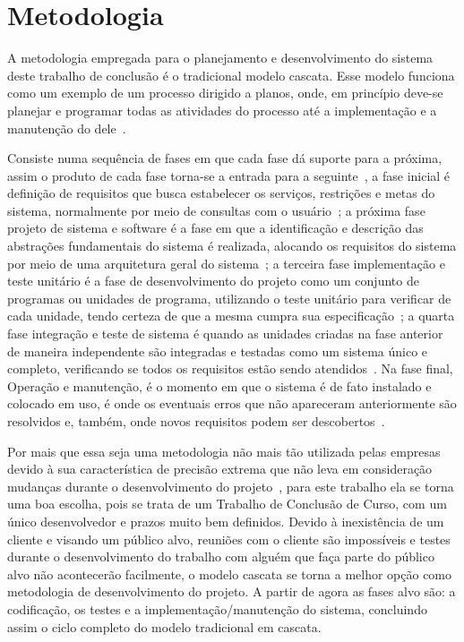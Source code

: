 \chapter{Metodologia}

A metodologia empregada para o planejamento e desenvolvimento do sistema deste trabalho de conclusão é o tradicional modelo cascata.
Esse modelo funciona como um exemplo de um processo dirigido a planos, onde, em princípio deve-se planejar e programar todas as atividades do processo até a implementação e a manutenção do dele~\cite{SOMMERVILLE1}.

Consiste numa sequência de fases em que cada fase dá suporte para a próxima, assim o produto de cada fase torna-se a entrada para a seguinte~\cite{BALTZAN1}, a fase inicial é definição de requisitos que busca estabelecer os serviços, restrições e metas do sistema, normalmente por meio de consultas com o usuário~\cite{SOMMERVILLE1}; a próxima fase projeto de sistema e software é a fase em que a identificação e descrição das abstrações fundamentais do sistema é realizada, alocando os requisitos do sistema por meio de uma arquitetura geral do sistema~\cite{SOMMERVILLE1}; a terceira fase implementação e teste unitário é a fase de desenvolvimento do projeto como um conjunto de programas ou unidades de programa, utilizando o teste unitário para verificar de cada unidade, tendo certeza de que a mesma cumpra sua especificação~\cite{SOMMERVILLE1}; a quarta fase integração e teste de sistema é quando as unidades criadas na fase anterior de maneira independente são integradas e testadas como um sistema único e completo, verificando se todos os requisitos estão sendo atendidos~\cite{SOMMERVILLE1}.
Na fase final, Operação e manutenção, é o momento em que o sistema é de fato instalado e colocado em uso, é onde os eventuais erros que não apareceram anteriormente são resolvidos e, também, onde novos requisitos podem ser descobertos~\cite{SOMMERVILLE1}. 

Por mais que essa seja uma metodologia não mais tão utilizada pelas empresas devido à sua característica de precisão extrema que não leva em consideração mudanças durante o desenvolvimento do projeto~\cite{BALTZAN1}, para este trabalho ela se torna uma boa escolha, pois se trata de um Trabalho de Conclusão de Curso, com um único desenvolvedor e prazos muito bem definidos.
Devido à inexistência de um cliente e visando um público alvo, reuniões com o cliente são impossíveis e testes durante o desenvolvimento do trabalho com alguém que faça parte do público alvo não acontecerão facilmente, o modelo cascata se torna a melhor opção como metodologia de desenvolvimento do projeto. A partir de agora as fases alvo são: a codificação, os testes e a implementação/manutenção do sistema, concluindo assim o ciclo completo do modelo tradicional em cascata.

